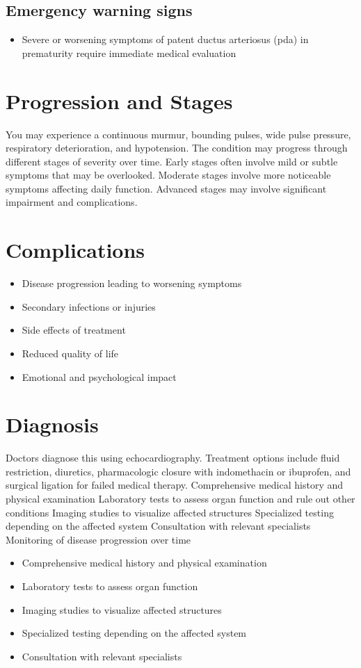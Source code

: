 \subsection{Emergency warning signs}
\begin{itemize}[noitemsep]
  \item Severe or worsening symptoms of patent ductus arteriosus (pda) in prematurity require immediate medical evaluation
\end{itemize}
\section{Progression and Stages}
You may experience a continuous murmur, bounding pulses, wide pulse pressure, respiratory deterioration, and hypotension. The condition may progress through different stages of severity over time. Early stages often involve mild or subtle symptoms that may be overlooked. Moderate stages involve more noticeable symptoms affecting daily function. Advanced stages may involve significant impairment and complications.
\section{Complications}
\begin{itemize}[noitemsep]
  \item Disease progression leading to worsening symptoms
  \item Secondary infections or injuries
  \item Side effects of treatment
  \item Reduced quality of life
  \item Emotional and psychological impact
\end{itemize}
\section{Diagnosis}
Doctors diagnose this using echocardiography. Treatment options include fluid restriction, diuretics, pharmacologic closure with indomethacin or ibuprofen, and surgical ligation for failed medical therapy. Comprehensive medical history and physical examination Laboratory tests to assess organ function and rule out other conditions Imaging studies to visualize affected structures Specialized testing depending on the affected system Consultation with relevant specialists Monitoring of disease progression over time

\begin{itemize}[noitemsep]
  \item Comprehensive medical history and physical examination
  \item Laboratory tests to assess organ function
  \item Imaging studies to visualize affected structures
  \item Specialized testing depending on the affected system
  \item Consultation with relevant specialists
\end{itemize}
